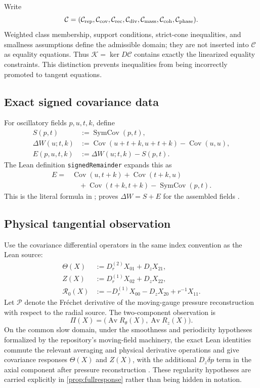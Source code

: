 \documentclass[12pt]{article}
\theoremstyle{plain}
\theoremstyle{definition}
\theoremstyle{remark}
\newcommand{\Cov}{\operatorname{Cov}}
\newcommand{\SymCov}{\operatorname{SymCov}}
\newcommand{\mean}{\operatorname{Av}}
\newcommand{\Constr}{\mathcal C}
\newcommand{\Obs}{\Pi}
\newcommand{\Ktan}{\mathcal K}
\begin{document}
Write
\[
\Constr
=(\Constr_{\rm rep},\Constr_{\rm cov},\Constr_{\rm rec},
\Constr_{\rm div},\Constr_{\rm mass},\Constr_{\rm coh},\Constr_{\rm phase}).
\]
Weighted class membership, support conditions, strict-cone inequalities, and smallness assumptions define the admissible domain; they are not inserted into \(\Constr\) as equality equations. Thus \(\Ktan=\ker D\Constr\) contains exactly the linearized equality constraints. This distinction prevents inequalities from being incorrectly promoted to tangent equations.

\subsection{Exact signed covariance data}
For oscillatory fields \(p,u,t,k\), define
\begin{align}
S(p,t)&:=\SymCov(p,t),\\
\Delta W(u;t,k)&:=\Cov(u+t+k,u+t+k)-\Cov(u,u),\\
E(p,u,t,k)&:=\Delta W(u;t,k)-S(p,t).
\end{align}
The Lean definition \texttt{signedRemainder} expands this as
\begin{align}\label{eq:exact-remainder}
E
={}&\Cov(u,t+k)+\Cov(t+k,u)\\
&\quad+\Cov(t+k,t+k)-\SymCov(p,t).
\end{align}
This is the literal formula in ;  proves \(\Delta W=S+E\) for the assembled fields \cite{OpenAILeanRepo2026}.

\subsection{Physical tangential observation}
Use the covariance differential operators in the same index convention as the Lean source:
\begin{align}
\Theta(X)&:=D_r^{(2)}X_{01}+D_zX_{21},\\
Z(X)&:=D_r^{(1)}X_{02}+D_zX_{22},\\
\mathcal R_0(X)&:=-D_r^{(1)}X_{00}-D_zX_{20}+r^{-1}X_{11}.
\end{align}
Let \(\mathscr P\) denote the Fr\'echet derivative of the moving-gauge pressure reconstruction with respect to the radial source. The two-component observation is
\[
\Obs(X)=\bigl(\mean R_\theta(X),\mean R_z(X)\bigr).
\]
On the common slow domain, under the smoothness and periodicity hypotheses formalized by the repository's moving-field machinery, the exact Lean identities commute the relevant averaging and physical derivative operations and give covariance responses \(\Theta(X)\) and \(Z(X)\), with the additional \(D_z\delta p\) term in the axial component after pressure reconstruction \cite{OpenAILeanRepo2026}. These regularity hypotheses are carried explicitly in \cref{prop:fullresponse} rather than being hidden in notation.
\end{document}
